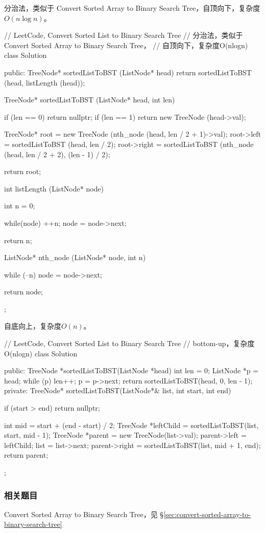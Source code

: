 分治法，类似于 Convert Sorted Array to Binary Search Tree，自顶向下，复杂度$O(n\log n)$。
\begin{Code}
// LeetCode, Convert Sorted List to Binary Search Tree
// 分治法，类似于 Convert Sorted Array to Binary Search Tree，
// 自顶向下，复杂度O(nlogn)
class Solution {
public:
    TreeNode* sortedListToBST (ListNode* head) {
        return sortedListToBST (head, listLength (head));
    }

    TreeNode* sortedListToBST (ListNode* head, int len) {
        if (len == 0) return nullptr;
        if (len == 1) return new TreeNode (head->val);

        TreeNode* root = new TreeNode (nth_node (head, len / 2 + 1)->val);
        root->left = sortedListToBST (head, len / 2);
        root->right = sortedListToBST (nth_node (head, len / 2 + 2), 
                (len - 1) / 2);

        return root;
    }

    int listLength (ListNode* node) {
        int n = 0;

        while(node) {
            ++n;
            node = node->next;
        }

        return n;
    }

    ListNode* nth_node (ListNode* node, int n) {
        while (--n)
            node = node->next;

        return node;
    }
};
\end{Code}

自底向上，复杂度$O(n)$。
\begin{Code}
// LeetCode, Convert Sorted List to Binary Search Tree
// bottom-up，复杂度O(nlogn)
class Solution {
public:
    TreeNode *sortedListToBST(ListNode *head) {
        int len = 0;
        ListNode *p = head;
        while (p) {
            len++;
            p = p->next;
        }
        return sortedListToBST(head, 0, len - 1);
    }
private:
    TreeNode* sortedListToBST(ListNode*& list, int start, int end) {
        if (start > end) return nullptr;

        int mid = start + (end - start) / 2;
        TreeNode *leftChild = sortedListToBST(list, start, mid - 1);
        TreeNode *parent = new TreeNode(list->val);
        parent->left = leftChild;
        list = list->next;
        parent->right = sortedListToBST(list, mid + 1, end);
        return parent;
    }
};
\end{Code}


\subsubsection{相关题目}
\begindot
\item Convert Sorted Array to Binary Search Tree，见 \S \ref{sec:convert-sorted-array-to-binary-search-tree}
\myenddot


